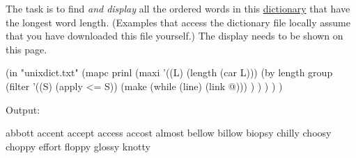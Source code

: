 The task is to find \emph{and display} all the ordered words in this
\href{http://www.puzzlers.org/pub/wordlists/unixdict.txt}{dictionary}
that have the longest word length. (Examples that access the dictionary
file locally assume that you have downloaded this file yourself.) The
display needs to be shown on this page.


\begin{wideverbatim}

(in "unixdict.txt"
   (mapc prinl
      (maxi '((L) (length (car L)))
         (by length group
            (filter '((S) (apply <= S))
               (make (while (line) (link @))) ) ) ) ) )

Output:

abbott
accent
accept
access
accost
almost
bellow
billow
biopsy
chilly
choosy
choppy
effort
floppy
glossy
knotty

\end{wideverbatim}



% 
